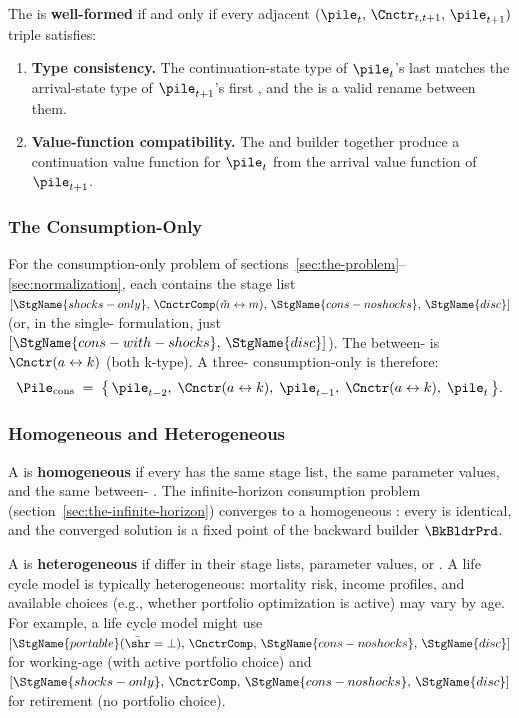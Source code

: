 \documentclass[titlepage, headings=optiontotocandhead]{econark}
\begin{document}
The {\pileName} is \textbf{well-formed} if and only if every adjacent
$(\pile_{t},\, \Cnctr_{t,t+1},\, \pile_{t+1})$ triple
satisfies:
\begin{enumerate}
  \item \textbf{Type consistency.} The continuation-state type of
    $\pile_{t}$'s last {\stg} matches the arrival-state type of
    $\pile_{t+1}$'s first {\stg}, and the {\Cnct} is a valid rename
    between them.
  \item \textbf{Value-function compatibility.} The {\Cnct} and builder
    together produce a continuation value function for $\pile_{t}$
    from the arrival value function of $\pile_{t+1}$.
\end{enumerate}

\subsubsection{The Consumption-Only {\PileName}}

For the consumption-only problem of
sections~\ref{sec:the-problem}--\ref{sec:normalization}, each {\interval}
contains the stage list
$[\StgName{shocks-only},\, \CnctrComp(\check{m} \leftrightarrow m),\,
  \StgName{cons-noshocks},\, \StgName{disc}]$
(or, in the single-{\stg} formulation, just
$[\StgName{cons-with-shocks},\, \StgName{disc}]$).
The between-{\interval} {\Cnct} is
$\Cnctr(a \leftrightarrow k)$ (both k-type).
A three-{\interval} consumption-only {\pileName} is therefore:
\begin{equation*}
  \Pile_{\text{cons}}
  \;=\;
  \bigl\{\,
    \pile_{t-2},\;
    \Cnctr(a \leftrightarrow k),\;
    \pile_{t-1},\;
    \Cnctr(a \leftrightarrow k),\;
    \pile_{t}
  \,\bigr\}.
\end{equation*}

\subsubsection{Homogeneous and Heterogeneous {\PilesName}}

A {\pileName} is \textbf{homogeneous} if every {\interval} has the same
stage list, the same parameter values, and the same between-{\interval}
{\Cnct}. The infinite-horizon consumption problem
(section~\ref{sec:the-infinite-horizon}) converges to a homogeneous
{\pileName}: every {\interval} is identical, and the converged solution
is a fixed point of the backward builder $\BkBldrPrd$.

A {\pileName} is \textbf{heterogeneous} if {\intervals} differ in their
stage lists, parameter values, or {\Cncts}. A life cycle model is
typically heterogeneous: mortality risk, income profiles, and available
choices (e.g., whether portfolio optimization is active) may vary by age.
For example, a life cycle model might use
$[\StgName{portable}(\bar{\shr}=\bot),\, \CnctrComp,\,
  \StgName{cons-noshocks},\, \StgName{disc}]$
for working-age {\intervals} (with active portfolio choice) and
$[\StgName{shocks-only},\, \CnctrComp,\,
  \StgName{cons-noshocks},\, \StgName{disc}]$
for retirement {\intervals} (no portfolio choice).
\end{document}
